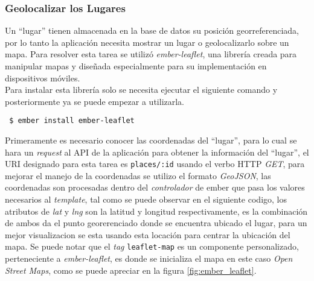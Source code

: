 

\subsubsection{Geolocalizar los Lugares}
\label{sub:fronted_lugares}



Un ``lugar'' tienen almacenada en la base de datos su posición georreferenciada, por lo tanto la aplicación necesita mostrar un lugar o geolocalizarlo sobre un mapa. Para resolver esta tarea se utilizó \emph{ember-leaflet}, una librería creada para manipular mapas y diseñada especialmente  para su implementación en dispositivos móviles.\\

Para instalar esta librería solo se necesita ejecutar el siguiente comando y posteriormente ya se puede empezar a utilizarla.\\

\begin{verbatim}
 $ ember install ember-leaflet
\end{verbatim}


Primeramente es necesario conocer las coordenadas del ``lugar'', para lo cual se hara un \emph{request} al API de la aplicación para obtener la información del ``lugar'', el URI designado para esta tarea es \verb|places/:id| usando el verbo HTTP \emph{GET}, para mejorar el manejo de la coordenadas se utilizo el formato \emph{GeoJSON}, las coordenadas son procesadas dentro del \emph{controlador} de ember que pasa los valores necesarios al \emph{template}, tal como se puede observar en el siguiente codigo, los atributos de \emph{lat} y \emph{lng} son la latitud y longitud respectivamente, es la combinación de ambos da el punto georerenciado donde se encuentra ubicado el lugar, para un mejor visualizacion se esta usando esta locación para centrar la ubicación del  mapa. Se puede notar que el \emph{tag} \verb|leaflet-map| es un componente personalizado, perteneciente a \emph{ember-leaflet}, es donde se inicializa el mapa en este caso \emph{Open Street Maps}, como se puede apreciar en la figura \ref{fig:ember_leaflet}.



